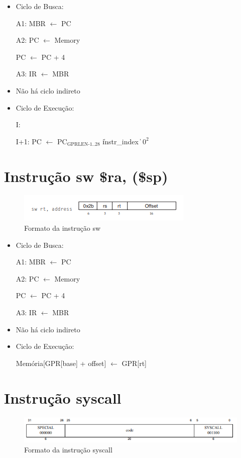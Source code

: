 \documentclass[
	12pt,				%
	oneside,			%
	a4paper,			%
	english,			%
	brazil				%
	]{abntex2ppgsi}
\begin{document}
\begin{itemize}
    \item Ciclo de Busca:

    A1: MBR $\leftarrow$ PC

    A2: PC $\leftarrow$ Memory

    PC $\leftarrow$ PC + 4

    A3: IR $\leftarrow$ MBR
    
    \item Não há ciclo indireto
    \item Ciclo de Execução:

    I:
    
    I+1: PC $\leftarrow$ $\text{PC}_{\text{GPRLEN-1..28}}$ \| instr\_index \| $0^2$
\end{itemize}

\section{Instrução sw \$ra, (\$sp)}

\begin{figure}[h]
    \centering
    \includegraphics{4_12.png}
    \caption{Formato da instrução sw}
    \label{fig4_12}
\end{figure}

\begin{itemize}
    \item Ciclo de Busca:

    A1: MBR $\leftarrow$ PC

    A2: PC $\leftarrow$ Memory

    PC $\leftarrow$ PC + 4

    A3: IR $\leftarrow$ MBR
    \item Não há ciclo indireto
    \item Ciclo de Execução:
    
    Memória[GPR[base] + offset] $\leftarrow$ GPR[rt]
    
\end{itemize}

\section{Instrução syscall}

\begin{figure}[h]
    \centering
    \includegraphics[width=1\linewidth]{4_13.png}
    \caption{Formato da instrução syscall}
    \label{fig4_13}
\end{figure}
\end{document}
